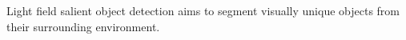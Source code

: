 \begin{englishabstract}
%
%	
%	
%
%
%
%
%
Light field salient object detection aims to segment visually unique objects from their surrounding environment.

\end{englishabstract}
